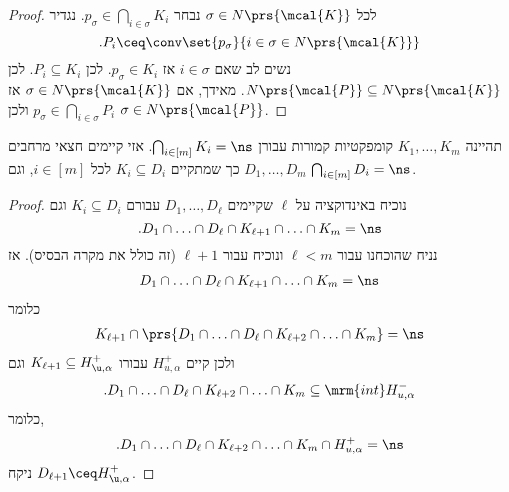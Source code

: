 \documentclass[a4paper,10pt,twoside,openany]{book}
\begin{document}
\begin{proof}
לכל
$\sigma \in N\prs{\mcal{K}}$
נבחר
$p_\sigma \in \bigcap_{i \in \sigma} K_i$.
נגדיר
\[\text{.} P_i \ceq \conv\set{p_\sigma}{i \in \sigma \in N\prs{\mcal{K}}}\]
נשים לב שאם
$i \in \sigma$
אז
$p_\sigma \in K_i$.
לכן
$P_i \subseteq K_i$.
לכן
$N\prs{\mcal{P}} \subseteq N\prs{\mcal{K}}$.
מאידך, אם
$\sigma \in N\prs{\mcal{K}}$
אז
$p_\sigma \in \bigcap_{i \in \sigma} P_i$
ולכן
$\sigma \in N\prs{\mcal{P}}$.
\end{proof}

\begin{corollary}\label{corollary:disjoint_halfplanes}
תהיינה
$K_1, \ldots, K_m$
קומפקטיות קמורות עבורן
$\bigcap_{i \in [m]} K_i = \ns$.
אזי קיימים חצאי מרחבים
$D_1, \ldots, D_m$
כך שמתקיים
$K_i \subseteq D_i$
לכל
$i \in [m]$,
וגם
$\bigcap_{i \in [m]} D_i = \ns$.
\end{corollary}

\begin{proof}
נוכיח באינדוקציה על
$\ell$
שקיימים
$D_1, \ldots, D_\ell$
עבורם
$K_i \subseteq D_i$
וגם
\[\text{.} D_1 \cap \ldots \cap D_\ell \cap K_{\ell + 1} \cap \ldots \cap K_m = \ns\]
נניח שהוכחנו עבור
$\ell < m$
ונוכיח עבור
$\ell+1$
(זה כולל את מקרה הבסיס).
אז
\begin{align*}
D_1 \cap \ldots \cap D_\ell \cap K_{\ell + 1} \cap \ldots \cap K_m = \ns
\end{align*}
כלומר
\begin{align*}
K_{\ell+1} \cap \prs{D_1 \cap \ldots \cap D_{\ell} \cap K_{\ell + 2} \cap \ldots \cap K_m} = \ns
\end{align*}
ולכן קיים
$H_{u,\alpha}^+$
עבורו
$K_{\ell+1} \subseteq H_{\u,\alpha}^+$
וגם
\[\text{.} D_1 \cap \ldots \cap D_\ell \cap K_{\ell+2} \cap \ldots \cap K_m \subseteq \mrm{int}H_{u,\alpha}^-\]
כלומר,
\[\text{.} D_1 \cap \ldots \cap D_\ell \cap K_{\ell+2} \cap \ldots \cap K_m \cap H_{u,\alpha}^+ = \ns\]
ניקח
$D_{\ell+1} \ceq H_{\u,\alpha}^+$.
\end{proof}
\end{document}
